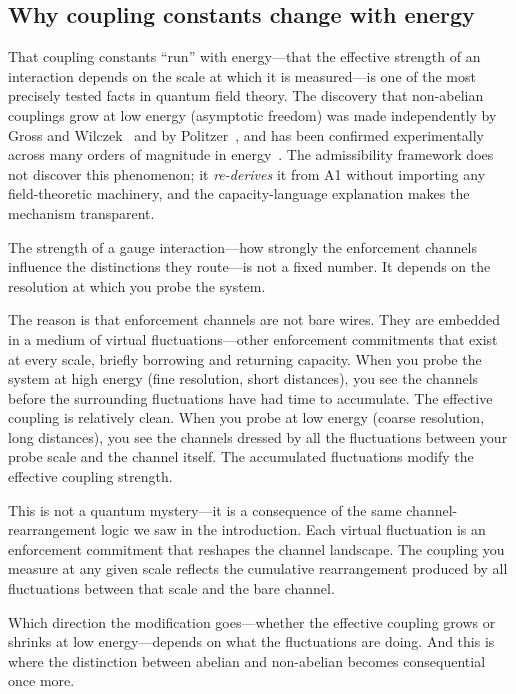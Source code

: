 \documentclass[11pt]{article}
\begin{document}
\subsection{Why coupling constants change with energy}

That coupling constants ``run'' with energy---that the effective strength of an interaction depends on the scale at which it is measured---is one of the most precisely tested facts in quantum field theory.  The discovery that non-abelian couplings grow at low energy (asymptotic freedom) was made independently by Gross and Wilczek~\cite{GrossWilczek1973} and by Politzer~\cite{Politzer1973}, and has been confirmed experimentally across many orders of magnitude in energy~\cite{PDG2024}.  The admissibility framework does not discover this phenomenon; it \emph{re-derives} it from A1 without importing any field-theoretic machinery, and the capacity-language explanation makes the mechanism transparent.

The strength of a gauge interaction---how strongly the enforcement channels influence the distinctions they route---is not a fixed number.  It depends on the resolution at which you probe the system.

The reason is that enforcement channels are not bare wires.  They are embedded in a medium of virtual fluctuations---other enforcement commitments that exist at every scale, briefly borrowing and returning capacity.  When you probe the system at high energy (fine resolution, short distances), you see the channels before the surrounding fluctuations have had time to accumulate.  The effective coupling is relatively clean.  When you probe at low energy (coarse resolution, long distances), you see the channels dressed by all the fluctuations between your probe scale and the channel itself.  The accumulated fluctuations modify the effective coupling strength.

This is not a quantum mystery---it is a consequence of the same channel-rearrangement logic we saw in the introduction.  Each virtual fluctuation is an enforcement commitment that reshapes the channel landscape.  The coupling you measure at any given scale reflects the cumulative rearrangement produced by all fluctuations between that scale and the bare channel.

Which direction the modification goes---whether the effective coupling grows or shrinks at low energy---depends on what the fluctuations are doing.  And this is where the distinction between abelian and non-abelian becomes consequential once more.
\end{document}
